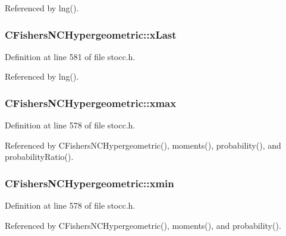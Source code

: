 Referenced by lng().

\subsubsection[{x\-Last}]{ C\-Fishers\-N\-C\-Hypergeometric\-::x\-Last\hspace{0.3cm}{\ttfamily [protected]}}\label{class_c_fishers_n_c_hypergeometric_a4d91db09920205bf20b2d3edad5a2725}


Definition at line 581 of file stocc.\-h.



Referenced by lng().

\subsubsection[{xmax}]{ C\-Fishers\-N\-C\-Hypergeometric\-::xmax\hspace{0.3cm}{\ttfamily [protected]}}\label{class_c_fishers_n_c_hypergeometric_a00a8d5f769e31ee0af1f5a8175db7d46}


Definition at line 578 of file stocc.\-h.



Referenced by C\-Fishers\-N\-C\-Hypergeometric(), moments(), probability(), and probability\-Ratio().

\subsubsection[{xmin}]{ C\-Fishers\-N\-C\-Hypergeometric\-::xmin\hspace{0.3cm}{\ttfamily [protected]}}\label{class_c_fishers_n_c_hypergeometric_a15eedbf742354964a9eaab5129c053b7}


Definition at line 578 of file stocc.\-h.



Referenced by C\-Fishers\-N\-C\-Hypergeometric(), moments(), and probability().



